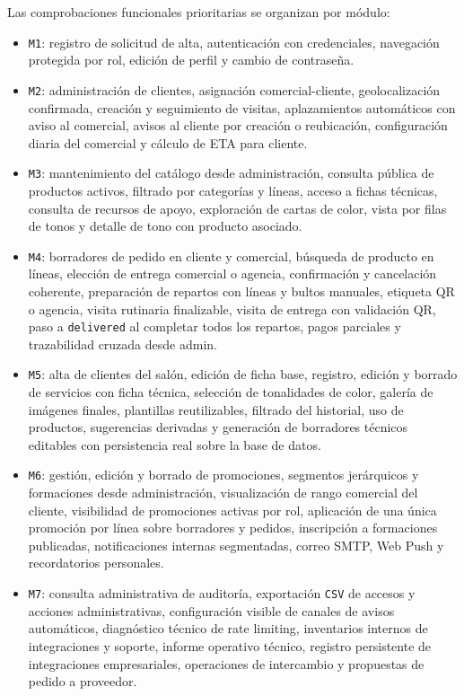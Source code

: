 Las comprobaciones funcionales prioritarias se organizan por módulo:

\begin{itemize}
    \item \texttt{M1}: registro de solicitud de alta, autenticación con credenciales, navegación protegida por rol, edición de perfil y cambio de contraseña.
    \item \texttt{M2}: administración de clientes, asignación comercial-cliente, geolocalización confirmada, creación y seguimiento de visitas, aplazamientos automáticos con aviso al comercial, avisos al cliente por creación o reubicación, configuración diaria del comercial y cálculo de ETA para cliente.
    \item \texttt{M3}: mantenimiento del catálogo desde administración, consulta pública de productos activos, filtrado por categorías y líneas, acceso a fichas técnicas, consulta de recursos de apoyo, exploración de cartas de color, vista por filas de tonos y detalle de tono con producto asociado.
    \item \texttt{M4}: borradores de pedido en cliente y comercial, búsqueda de producto en líneas, elección de entrega comercial o agencia, confirmación y cancelación coherente, preparación de repartos con líneas y bultos manuales, etiqueta QR o agencia, visita rutinaria finalizable, visita de entrega con validación QR, paso a \texttt{delivered} al completar todos los repartos, pagos parciales y trazabilidad cruzada desde admin.
    \item \texttt{M5}: alta de clientes del salón, edición de ficha base, registro, edición y borrado de servicios con ficha técnica, selección de tonalidades de color, galería de imágenes finales, plantillas reutilizables, filtrado del historial, uso de productos, sugerencias derivadas y generación de borradores técnicos editables con persistencia real sobre la base de datos.
    \item \texttt{M6}: gestión, edición y borrado de promociones, segmentos jerárquicos y formaciones desde administración, visualización de rango comercial del cliente, visibilidad de promociones activas por rol, aplicación de una única promoción por línea sobre borradores y pedidos, inscripción a formaciones publicadas, notificaciones internas segmentadas, correo SMTP, Web Push y recordatorios personales.
    \item \texttt{M7}: consulta administrativa de auditoría, exportación \texttt{CSV} de accesos y acciones administrativas, configuración visible de canales de avisos automáticos, diagnóstico técnico de rate limiting, inventarios internos de integraciones y soporte, informe operativo técnico, registro persistente de integraciones empresariales, operaciones de intercambio y propuestas de pedido a proveedor.
\end{itemize}

